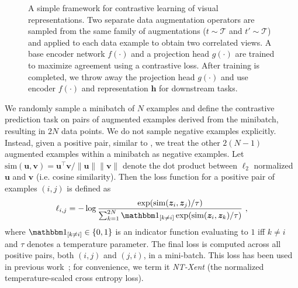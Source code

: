 \documentclass{article}
\begin{document}
\begin{figure}[!t]
\small
    \centering
{}
    \caption{A simple framework for contrastive learning of visual representations. 
    Two separate data augmentation operators are sampled from the same family of augmentations ($t\sim \mathcal{T}$ and $t'\sim \mathcal{T}$) and applied to each data example to obtain two correlated views.
    A base encoder network $f(\cdot)$ and a projection head $g(\cdot)$ are trained to maximize agreement using a contrastive loss. After training is completed, we throw away the projection head $g(\cdot)$ and use encoder $f(\cdot)$ and representation $\bm h$ for downstream tasks.}
    \label{fig:framework}
\end{figure}

We randomly sample a minibatch of $N$ examples and define the contrastive prediction task on pairs of augmented examples derived from the minibatch, resulting in $2N$ data points. We do not sample negative examples explicitly.
Instead, given a positive pair, similar to \cite{chen2017sampling}, we treat the other $2(N-1)$ augmented examples within a minibatch as negative examples.
Let $\mathrm{sim}(\bm u,\bm v) = \bm u^\top \bm v / \lVert\bm u\rVert \lVert\bm v\rVert$ denote the dot product between $\ell_2$ normalized $\bm u$ and $\bm v$ (i.e. cosine similarity). Then the loss function for a positive pair of examples $(i, j)$ is defined as
\begin{equation}
\label{eq:loss}
    \ell_{i,j} = -\log \frac{\exp(\mathrm{sim}(\bm z_i, \bm z_j)/\tau)}{\sum_{k=1}^{2N} \one{k \neq i}\exp(\mathrm{sim}(\bm z_i, \bm z_k)/\tau)}~,
\end{equation}
where $\one{k \neq i} \in \{ 0,  1\}$ is an indicator function evaluating to $1$ iff $k \neq i$ and $\tau$ denotes a temperature parameter. The final loss is computed across all positive pairs, both $(i, j)$ and $(j, i)$, in a mini-batch.
This loss has been used in previous work~\cite{sohn2016improved,wu2018unsupervised,oord2018representation}; for convenience, we term it \textit{NT-Xent} (the normalized temperature-scaled cross entropy loss).
\end{document}
